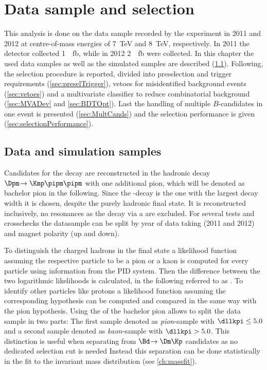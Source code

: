 \chapter{Data sample and selection}

\linespread{1.08}\selectfont
This analysis is done on the data sample recorded by the \lhcb experiment in \num{2011} and \num{2012} at centre-of-mass energies of \SI{7}{\tera\electronvolt} and \SI{8}{\tera\electronvolt}, respectively.
In \num{2011} the detector collected \SI{1}{\per\femto\barn}, while in \num{2012} \SI{2}{\per\femto\barn} were collected.
In this chapter the used data samples as well as the simulated samples are described (\cref{sec:Samples}).
Following, the selection procedure is reported, divided into preselection and trigger requirements (\cref{sec:preselTrigger}), vetoes for \eg misidentified background events (\cref{sec:vetoes}) and a multivariate classifier to reduce combinatorial background (\cref{sec:MVADev} and \cref{sec:BDTOpt}).
Last the handling of multiple $B$-candidates in one event is presented (\cref{sec:MultCands}) and the selection performance is given (\cref{sec:selectionPerformance}).

\section{Data and simulation samples}
\label{sec:Samples}

Candidates for the decay \BdToDpi are reconstructed in the hadronic decay $\Dpm\!\to\Kmp\pipm\pipm$ with one additional pion, which will be denoted as bachelor pion in the following.
Since the \D-decay is the one with the largest decay width it is chosen, despite the purely hadronic final state.
It is reconstructed inclusively, \ie no resonances as the decay via a \Kstarz are excluded.
For several tests and crosschecks the datasample can be split by year of data taking (\num{2011} and \num{2012}) and magnet polarity (up and down).

To distinguish the charged hadrons in the final state a likelihood function assuming the respective particle to be a pion or a kaon is computed for every particle using information from the PID system.
Then the difference between the two logarithmic likelihoods is calculated, in the following referred to as \dllkpi.
To identify other particles like protons a likelihood function assuming the corresponding hypothesis can be computed and compared in the same way with the pion hypothesis.
Using the \dllkpi of the bachelor pion allows to split the data sample in two parts: The first sample denoted as \emph{pion}-sample with $\dllkpi\leq5.0$ and a second sample denoted as \emph{kaon}-sample with $\dllkpi>5.0$. This distinction is useful when separating \BdToDpi from $\Bd\!\to\Dm\Kp$ candidates as no dedicated selection cut is needed
Instead this separation can be done statistically in the fit to the invariant mass distribution (see \cref{ch:massfit}).

